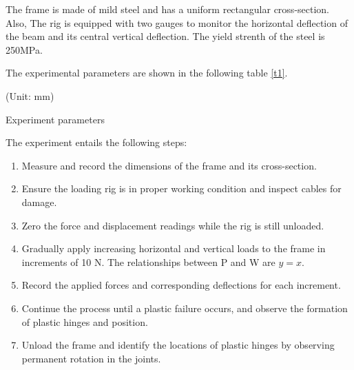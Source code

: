 \iffalse
The frame is made of mild steel and has a uniform rectangular cross-section. Also, The rig is equipped with two gauges to monitor the horizontal deflection of the beam and its central vertical deflection. The yield strenth of the steel is 250MPa.

The experimental parameters are shown in the following table \autoref{t1}.

\begin{minipage}[htbp]{\textwidth}
    \makeatletter{}
    \centering

    (Unit: mm)
    \caption{Experiment parameters}
    \label{t1} 
\end{minipage}


The experiment entails the following steps:
\begin{enumerate}
    \item Measure and record the dimensions of the frame and its cross-section.

    \item Ensure the loading rig is in proper working condition and inspect cables for damage.
    
    \item Zero the force and displacement readings while the rig is still unloaded.
    
    \item Gradually apply increasing horizontal and vertical loads to the frame in increments of 10 N. The relationships between P and W are $y=x$\label{ee1}.
    
    \item Record the applied forces and corresponding deflections for each increment.
    
    \item Continue the process until a plastic failure occurs, and observe the formation of plastic hinges and position.
    
    \item Unload the frame and identify the locations of plastic hinges by observing permanent rotation in the joints.
    
\end{enumerate}

